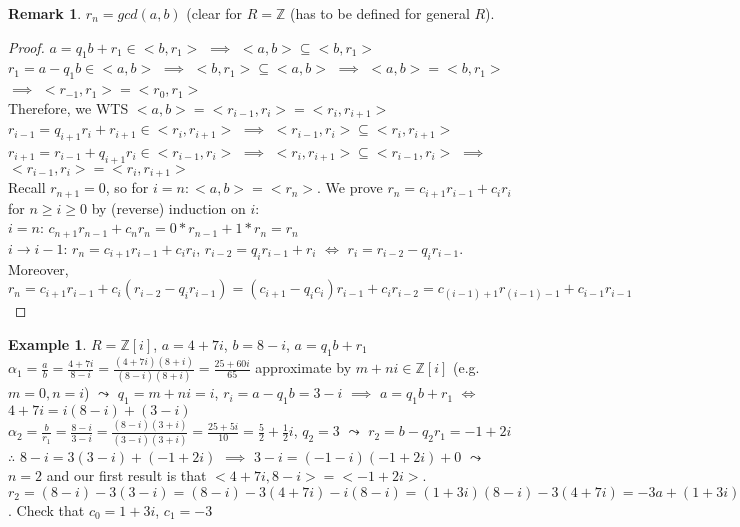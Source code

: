 \documentclass[11pt]{article}
\theoremstyle{definition}
\newtheorem{example}[thm]{Example}
\newtheorem{remark}[thm]{Remark}
\numberwithin{equation}{section}
\newcommand{\Z}{\mathbb{Z}}
\begin{document}
\begin{remark}
$r_{n} = gcd(a, b)$ (clear for $R = \Z$ (has to be defined for general $R$).
\end{remark}

\begin{proof}
$a = q_{1}b+r_{1} \in <b, r_{1}>$ $\implies$ $<a, b> \subseteq <b, r_{1}>$\\
$r_{1} = a - q_{1}b \in <a, b>$ $\implies$ $<b, r_{1}> \subseteq <a, b>$ $\implies$ $<a, b> = <b, r_{1}>$ $\implies$ $<r_{-1}, r_{1}> =<r_{0}, r_{1}>$\\
Therefore, we WTS $<a, b> = <r_{i-1}, r_{i}> = <r_{i}, r_{i+1}>$\\
$r_{i-1} = q_{i+1}r_{i} + r_{i+1} \in <r_{i}, r_{i+1}>$ $\implies$ $<r_{i-1}, r_{i}> \subseteq <r_{i}, r_{i+1}>$\\
$r_{i+1} = r_{i-1} + q_{i+1}r_{i} \in <r_{i-1}, r_{i}>$ $\implies$ $<r_{i}, r_{i+1}> \subseteq <r_{i-1}, r_{i}>$ $\implies$ $<r_{i-1}, r_{i}> = <r_{i}, r_{i+1}>$\\
Recall $r_{n+1} = 0$, so for $i = n: <a, b> = <r_{n}>$. We prove $r_{n} = c_{i+1}r_{i-1}+c_{i}r_{i}$ for $n \geq i \geq 0$ by (reverse) induction on $i$:\\
\underline{$i=n$}: $c_{n+1}r_{n-1}+c_{n}r_{n} = 0*r_{n-1} + 1*r_{n} = r_{n}$\\
$i \rightarrow i-1$: $r_{n} = c_{i+1}r_{i-1}+c_{i}r_{i}$, $r_{i-2} = q_{i}r_{i-1}+r_{i}$ $\Longleftrightarrow$ $r_{i} = r_{i-2} - q_{i}r_{i-1}$. Moreover, $r_{n} = c_{i+1}r_{i-1} + c_{i}(r_{i-2}-q_{i}r_{i-1}) = (c_{i+1}-q_{i}c_{i})r_{i-1} + c_{i}r_{i-2} = c_{(i-1)+1}r_{(i-1)-1}+c_{i-1}r_{i-1}$
\end{proof}

\begin{example}
$R = \Z[i]$, $a = 4+7i$, $b = 8 - i$, $a = q_{1}b+r_{1}$\\
$\alpha_{1} = \frac{a}{b} = \frac{4+7i}{8-i} = \frac{(4+7i)(8+i)}{(8-i)(8+i)} = \frac{25 + 60i}{65}$ approximate by $m+ni \in \Z[i]$ (e.g. $m = 0, n = i$) $\leadsto$ $q_{1} = m+ni = i$, $r_{i} = a-q_{1}b = 3-i$ $\implies$ $a = q_{1}b+r_{1}$ $\Longleftrightarrow$ $4+7i = i(8-i)+(3-i)$\\
$\alpha_{2} = \frac{b}{r_{1}} = \frac{8-i}{3-i} = \frac{(8-i)(3+i)}{(3-i)(3+i)} = \frac{25+5i}{10} = \frac{5}{2} + \frac{1}{2}i$, $q_{2} = 3$ $\leadsto$ $r_{2} = b-q_{2}r_{1} = -1+2i$\\
$\therefore$ $8-i = 3(3-i)+(-1+2i)$ $\implies$ $3-i = (-1-i)(-1+2i)+0$ $\leadsto$ $n = 2$ and our first result is that $<4+7i, 8-i> = <-1+2i>$.\\
$r_{2} = (8-i)-3(3-i) = (8-i)-3(4+7i)-i(8-i) = (1+3i)(8-i)-3(4+7i) = -3a+(1+3i)b = c_{1}a+c_{0}b$. Check that $c_{0} = 1+3i$, $c_{1} = -3$
\end{example}
\end{document}
